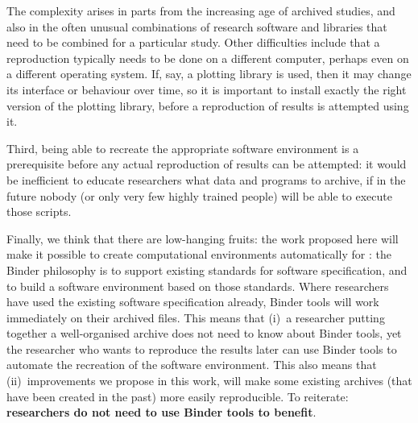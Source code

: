The complexity arises in parts from the increasing age of archived studies, and
also in the often unusual combinations of research software and libraries that
need to be combined for a particular study. Other difficulties include that a
reproduction typically needs to be done on a different computer, perhaps even on
a different operating system. If, say, a plotting library is used, then it may
change its interface or behaviour over time, so it is important to install
exactly the right version of the plotting library, before a reproduction of
results is attempted using it.

Third, being able to recreate the appropriate software environment is a
prerequisite before any actual reproduction of results can be attempted: it
would be inefficient to educate researchers what data and programs to archive,
if in the future nobody (or only very few highly trained people) will be able to
execute those scripts.

Finally, we think that there are low-hanging fruits: the work proposed here will
make it possible to create computational environments automatically for
: the Binder philosophy is to support existing standards for software
specification, and to  build a software environment based on those standards.
Where researchers have used the existing software specification already, Binder tools
will work immediately on their archived files. This means that (i)~a researcher
putting together a well-organised archive does not need to know about Binder tools,
yet the researcher who wants to reproduce the results later can use Binder tools to
automate the recreation of the software environment. This also means that
(ii)~improvements we propose in this work, will make some existing archives (that
have been created in the past) more easily reproducible.
To reiterate: \textbf{researchers do not need to use Binder tools to benefit}.

